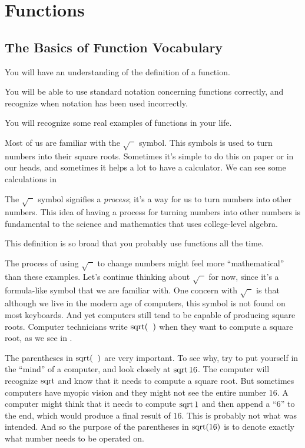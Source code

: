 \typeout{************************************************}
\typeout{************************************************}
%
\chapter{Functions}\label{chapter-1}
%
\minitoc
%
\typeout{************************************************}
\typeout{************************************************}
%
\section{The Basics of Function Vocabulary}\label{section-1}
%
\begin{outcomes}
\begin{outcomelist}
\item You will have an understanding of the definition of a function.%
\item You will be able to use standard notation concerning functions
	                correctly, and recognize when notation has been used incorrectly.%
\item You will recognize some real examples of functions in your life.%
\end{outcomelist}
\end{outcomes}
%
Most of us are familiar with the $\sqrt{\phantom{x}}$ symbol.
		This symbols is used to turn numbers into their square roots. Sometimes it's
		simple to do this on paper or in our heads, and sometimes it helps a lot to
		have a calculator. We can see some calculations in 
%
\par The $\sqrt{\phantom{x}}$ symbol signifies a \emph{process}; it's a way for us to
		turn numbers into other numbers. This idea of having a process for turning numbers into other
		numbers is fundamental to the science and mathematics that uses college-level algebra.
%
\par This definition is so broad that you probably use functions all the time.
%
\par The process of using $\sqrt{\phantom{x}}$ to change numbers might feel more ``mathematical''
		than these examples. Let's continue thinking about $\sqrt{\phantom{x}}$ for now, since
		it's a formula-like symbol that we are familiar with. One concern with  $\sqrt{\phantom{x}}$
		is that although we live in the modern age of computers, this symbol is not found on most
		keyboards. And yet computers still tend to be capable of producing square roots. Computer
		technicians write $\sq[(]$ when they want to compute a square root, as we see in .
%
\par  The parentheses in $\sq[(]$ are very important. To see why, try to put yourself in the
		``mind'' of a computer, and look closely at $\sq\num{16}$. The computer will recognize $\sq$
		and know that it needs to compute a square root. But sometimes computers have myopic vision and 
		they might not see the entire number $\num{16}$. A computer might think that it needs to compute 
		$\sq\num{1}$ and then append a ``6'' to the end, which would produce a final result of $\num{16}$. 
		This is probably not what was intended. And so the purpose of the parentheses in $\sq[\num{16}]$ is 
		to denote exactly what number needs to be operated on.
%
